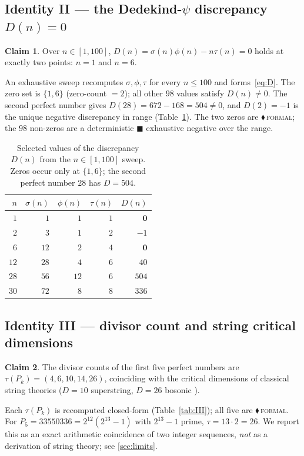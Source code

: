\documentclass[11pt,a4paper]{article}
\newcommand{\sig}{\sigma}
\theoremstyle{definition}
\newtheorem{claim}{Claim}
\begin{document}
\subsection{Identity II --- the Dedekind-\texorpdfstring{$\psi$}{psi} discrepancy \texorpdfstring{$D(n)=0$}{}}
\label{sec:II}

\begin{claim}
Over $n\in[1,100]$, $D(n)=\sig(n)\phi(n)-n\tau(n)=0$ holds at exactly two
points: $n=1$ and $n=6$.
\end{claim}
\noindent An exhaustive sweep recomputes $\sig,\phi,\tau$ for every
$n\le 100$ and forms~\eqref{eq:D}. The zero set is $\{1,6\}$
(zero-count $=2$); all other $98$ values satisfy $D(n)\neq 0$. The second
perfect number gives $D(28)=672-168=504\neq 0$, and $D(2)=-1$ is the unique
negative discrepancy in range (Table~\ref{tab:II}). The two zeros are
\textcolor{blue!60!black}{$\blacklozenge$}\,\textsc{formal}; the $98$ non-zeros
are a deterministic \textcolor{red!70!black}{$\blacksquare$} exhaustive
negative over the range.

\begin{table}[h]
\centering
\caption{Selected values of the discrepancy $D(n)$ from the $n\in[1,100]$
sweep. Zeros occur only at $\{1,6\}$; the second perfect number $28$ has
$D=504$.}
\label{tab:II}
\begin{tabular}{rrrrr}
\toprule
$n$ & $\sig(n)$ & $\phi(n)$ & $\tau(n)$ & $D(n)$\\
\midrule
$1$  & $1$   & $1$  & $1$ & $\mathbf{0}$\\
$2$  & $3$   & $1$  & $2$ & $-1$\\
$6$  & $12$  & $2$  & $4$ & $\mathbf{0}$\\
$12$ & $28$  & $4$  & $6$ & $40$\\
$28$ & $56$  & $12$ & $6$ & $504$\\
$30$ & $72$  & $8$  & $8$ & $336$\\
\bottomrule
\end{tabular}
\end{table}

\subsection{Identity III --- divisor count and string critical dimensions}
\label{sec:III}

\begin{claim}
The divisor counts of the first five perfect numbers are
$\tau(P_k)=(4,6,10,14,26)$, coinciding with the critical dimensions of
classical string theories ($D=10$ superstring, $D=26$ bosonic
\citep{polchinski}).
\end{claim}
\noindent Each $\tau(P_k)$ is recomputed closed-form
(Table~\ref{tab:III}); all five are
\textcolor{blue!60!black}{$\blacklozenge$}\,\textsc{formal}. For
$P_5=33550336=2^{12}(2^{13}-1)$ with $2^{13}-1$ prime, $\tau=13\cdot 2=26$.
We report this as an exact arithmetic coincidence of two integer sequences,
\emph{not} as a derivation of string theory; see \textsection\ref{sec:limits}.
\end{document}
